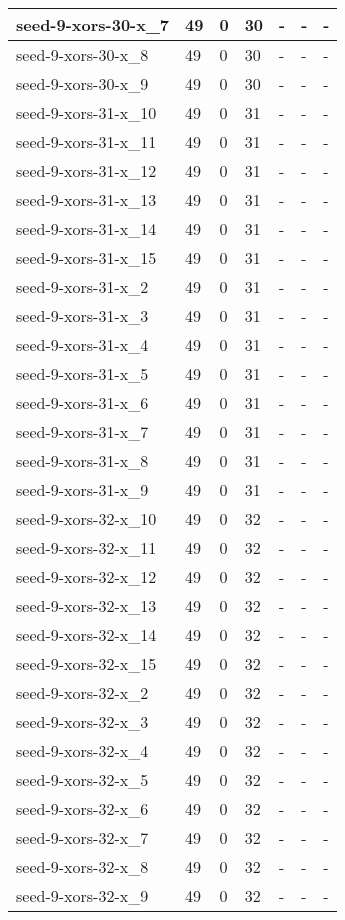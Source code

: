 \begin{scriptsize}
\begin{longtable}{|p{5cm}|l|l|l|l|l|l|}
seed-9-xors-30-x\_7&49&0&30&-&-&- \\ \hline 
seed-9-xors-30-x\_8&49&0&30&-&-&- \\ \hline 
seed-9-xors-30-x\_9&49&0&30&-&-&- \\ \hline 
seed-9-xors-31-x\_10&49&0&31&-&-&- \\ \hline 
seed-9-xors-31-x\_11&49&0&31&-&-&- \\ \hline 
seed-9-xors-31-x\_12&49&0&31&-&-&- \\ \hline 
seed-9-xors-31-x\_13&49&0&31&-&-&- \\ \hline 
seed-9-xors-31-x\_14&49&0&31&-&-&- \\ \hline 
seed-9-xors-31-x\_15&49&0&31&-&-&- \\ \hline 
seed-9-xors-31-x\_2&49&0&31&-&-&- \\ \hline 
seed-9-xors-31-x\_3&49&0&31&-&-&- \\ \hline 
seed-9-xors-31-x\_4&49&0&31&-&-&- \\ \hline 
seed-9-xors-31-x\_5&49&0&31&-&-&- \\ \hline 
seed-9-xors-31-x\_6&49&0&31&-&-&- \\ \hline 
seed-9-xors-31-x\_7&49&0&31&-&-&- \\ \hline 
seed-9-xors-31-x\_8&49&0&31&-&-&- \\ \hline 
seed-9-xors-31-x\_9&49&0&31&-&-&- \\ \hline 
seed-9-xors-32-x\_10&49&0&32&-&-&- \\ \hline 
seed-9-xors-32-x\_11&49&0&32&-&-&- \\ \hline 
seed-9-xors-32-x\_12&49&0&32&-&-&- \\ \hline 
seed-9-xors-32-x\_13&49&0&32&-&-&- \\ \hline 
seed-9-xors-32-x\_14&49&0&32&-&-&- \\ \hline 
seed-9-xors-32-x\_15&49&0&32&-&-&- \\ \hline 
seed-9-xors-32-x\_2&49&0&32&-&-&- \\ \hline 
seed-9-xors-32-x\_3&49&0&32&-&-&- \\ \hline 
seed-9-xors-32-x\_4&49&0&32&-&-&- \\ \hline 
seed-9-xors-32-x\_5&49&0&32&-&-&- \\ \hline 
seed-9-xors-32-x\_6&49&0&32&-&-&- \\ \hline 
seed-9-xors-32-x\_7&49&0&32&-&-&- \\ \hline 
seed-9-xors-32-x\_8&49&0&32&-&-&- \\ \hline 
seed-9-xors-32-x\_9&49&0&32&-&-&- \\ \hline 

\end{longtable}
\end{scriptsize}
